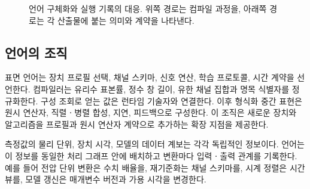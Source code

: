\begin{figure}[tb]
\centering
{}
\caption{언어 구체화와 실행 기록의 대응. 위쪽 경로는 컴파일 과정을, 아래쪽 경로는 각 산출물에 붙는 의미와 계약을 나타낸다.}
\label{fig:architecture}
\end{figure}

\subsection{언어의 조직}
표면 언어는 장치 프로필 선택, 채널 스키마, 신호 연산, 학습 프로토콜, 시간 계약을 선언한다.
컴파일러는 유리수 표본률, 정수 창 길이, 유한 채널 집합과 명목 식별자를 정규화한다.
구성 조회로 얻는 값은 런타임 기술자와 연결한다. 이후 형식화 중간 표현은 원시 연산자,
직렬ㆍ병렬 합성, 지연, 피드백으로 구성한다. 이 조직은 새로운 장치와 알고리즘을
프로필과 원시 연산자 계약으로 추가하는 확장 지점을 제공한다.

측정값의 물리 단위, 장치 시각, 모델의 데이터 계보는 각각 독립적인 정보이다.
언어는 이 정보를 동일한 처리 그래프 안에 배치하고 변환마다 입력ㆍ출력 관계를 기록한다.
예를 들어 전압 단위 변환은 수치 배율을, 재기준화는 채널 스키마를,
시계 정렬은 시간 뷰를, 모델 갱신은 매개변수 버전과 가용 시각을 변경한다.
